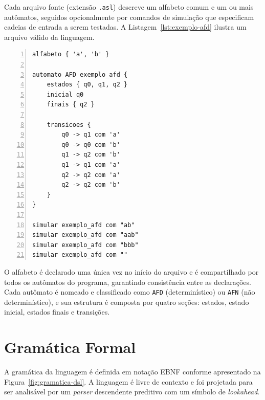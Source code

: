 \documentclass[
    12pt
    ,oneside
    ,a4paper
    ,chapter=TITLE
    ,section=TITLE
    ,sumario=abnt-6027-2012]{abntex2}
\begin{document}
Cada arquivo fonte (extensão \texttt{.asl}) descreve um alfabeto comum e um ou mais
autômatos, seguidos opcionalmente por comandos de simulação que especificam cadeias
de entrada a serem testadas. A Listagem~\ref{lst:exemplo-afd} ilustra um arquivo
válido da linguagem.

\begin{lstlisting}[caption={EXEMPLO DE AFD DESCRITO NA DSL AUTOSIM}, label={lst:exemplo-afd}, language={}, numbers=left, frame=single]
alfabeto { 'a', 'b' }

automato AFD exemplo_afd {
    estados { q0, q1, q2 }
    inicial q0
    finais { q2 }

    transicoes {
        q0 -> q1 com 'a'
        q0 -> q0 com 'b'
        q1 -> q2 com 'b'
        q1 -> q1 com 'a'
        q2 -> q2 com 'a'
        q2 -> q2 com 'b'
    }
}

simular exemplo_afd com "ab"
simular exemplo_afd com "aab"
simular exemplo_afd com "bbb"
simular exemplo_afd com ""
\end{lstlisting}

O alfabeto é declarado uma única vez no início do arquivo e é compartilhado por todos os
autômatos do programa, garantindo consistência entre as declarações. Cada autômato é
nomeado e classificado como \texttt{AFD} (determinístico) ou \texttt{AFN}
(não determinístico), e sua estrutura é composta por quatro seções: estados, estado
inicial, estados finais e transições.

\section{Gramática Formal}
\label{sec:dsl-gramatica}

A gramática da linguagem é definida em notação EBNF conforme apresentado na
Figura~\ref{fig:gramatica-dsl}. A linguagem é livre de contexto e foi projetada para ser
analisável por um \textit{parser} descendente preditivo com um símbolo de
\textit{lookahead}.
\end{document}
